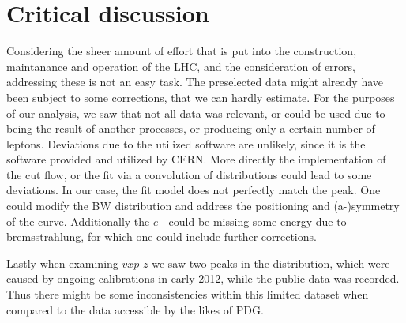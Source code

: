 \documentclass[11 pt]{article}
\begin{document}
\section{Critical discussion}
Considering the sheer amount of effort that is put into the construction, maintanance and operation of the LHC, and the consideration of errors, addressing these is not an easy task. The preselected data might already have been subject to some corrections, that we can hardly estimate. For the purposes of our analysis, we saw that not all data was relevant, or could be used due to being the result of another processes, or producing only a certain number of leptons. 
Deviations due to the utilized software are unlikely, since it is the software  provided and utilized by CERN. More directly the implementation of the cut flow, or the fit via a convolution of distributions could lead to some deviations. In our case,  the fit model does not perfectly match the peak. One could modify the BW distribution and address the positioning and (a-)symmetry of the curve.
Additionally the $e^-$ could be missing some energy due to bremsstrahlung, for which one could include further corrections.

Lastly when examining $vxp\_z$ we saw two peaks in the distribution, which were caused by ongoing calibrations in early 2012, while the public data was recorded. Thus there might be some inconsistencies within this limited dataset when compared to the data accessible by the likes of PDG.
\end{document}
